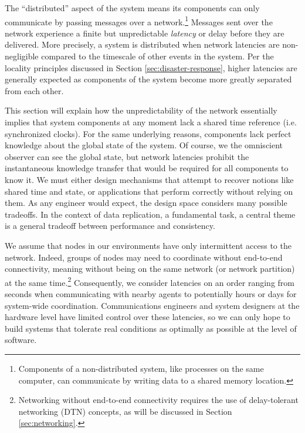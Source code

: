 \documentclass[]             %
{NASA}                       %
\theoremstyle{definition}
\begin{document}
The ``distributed'' aspect of the system means its components can only
communicate by passing messages over a network.\footnote{Components of
  a non-distributed system, like processes on the same computer, can
  communicate by writing data to a shared memory location.} Messages
sent over the network experience a finite but unpredictable
\emph{latency} or delay before they are delivered. More precisely, a
system is distributed when network latencies are non-negligible
compared to the timescale of other events in the system. Per the
locality principles discussed in Section \ref{sec:disaster-response},
higher latencies are generally expected as components of the system
become more greatly separated from each other.

This section will explain how the unpredictability of the network
essentially implies that system components at any moment lack a shared
time reference (i.e. synchronized clocks). For the same underlying
reasons, components lack perfect knowledge about the global state of
the system. Of course, we the omniscient observer can see the global
state, but network latencies prohibit the instantaneous knowledge
transfer that would be required for all components to know it. We must
either design mechanisms that attempt to recover notions like shared
time and state, or applications that perform correctly without relying
on them. As any engineer would expect, the design space considers many
possible tradeoffs. In the context of data replication, a fundamental
task, a central theme is a general tradeoff between performance and
consistency.

We assume that nodes in our environments have only intermittent access
to the network. Indeed, groups of nodes may need to coordinate without
end-to-end connectivity, meaning without being on the same network (or
network partition) at the same time.\footnote{Networking without
  end-to-end connectivity requires the use of delay-tolerant
  networking (DTN) concepts, as will be discussed in Section
  \ref{sec:networking}.}  Consequently, we consider latencies on an
order ranging from seconds when communicating with nearby agents to
potentially hours or days for system-wide coordination.
Communications engineers and system designers at the hardware level
have limited control over these latencies, so we can only hope to
build systems that tolerate real conditions as optimally as possible
at the level of software.
\end{document}

